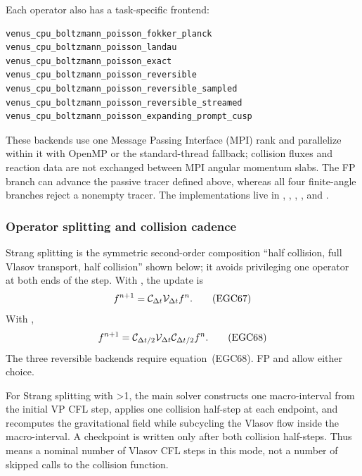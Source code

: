 Each operator also has a task-specific frontend:
\begin{lstlisting}[basicstyle=\ttfamily\scriptsize]
venus_cpu_boltzmann_poisson_fokker_planck
venus_cpu_boltzmann_poisson_landau
venus_cpu_boltzmann_poisson_exact
venus_cpu_boltzmann_poisson_reversible
venus_cpu_boltzmann_poisson_reversible_sampled
venus_cpu_boltzmann_poisson_reversible_streamed
venus_cpu_boltzmann_poisson_expanding_prompt_cusp
\end{lstlisting}
These backends use one Message Passing Interface (MPI) rank and parallelize
within it with OpenMP or the standard-thread fallback; collision fluxes and
reaction data are not exchanged between MPI angular momentum slabs.  The FP
branch can advance the passive tracer defined above, whereas all four
finite-angle branches reject a nonempty tracer.  The implementations live in
,
,
,
, and
.

\subsubsection{Operator splitting and collision cadence}

Strang splitting is the symmetric second-order composition ``half collision,
full Vlasov transport, half collision'' shown below; it avoids privileging
one operator at both ends of the step.
With , the update is
\[
 f^{n+1}={\cal C}_{\Delta t}{\cal V}_{\Delta t}f^n.       \tag{EGC67}
\]
With ,
\[
 f^{n+1}=
 {\cal C}_{\Delta t/2}{\cal V}_{\Delta t}
 {\cal C}_{\Delta t/2}f^n.                               \tag{EGC68}
\]
The three reversible backends require equation~(EGC68).  FP and
 allow either choice.

For Strang splitting with >1, the main solver
constructs one macro-interval from the initial VP CFL step, applies one
collision half-step at each endpoint, and recomputes the gravitational field
while subcycling the Vlasov flow inside the macro-interval.  A checkpoint is
written only after both collision half-steps.  Thus
 means a nominal number of Vlasov CFL steps in
this mode, not a number of skipped calls to the collision function.

